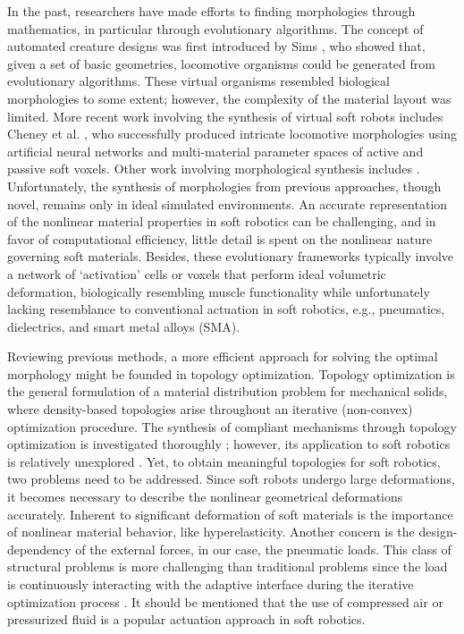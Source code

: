 In the past, researchers have made efforts to finding morphologies through mathematics, in particular through evolutionary algorithms. The concept of automated creature designs was first introduced by Sims \cite{Sims1994}, who showed that, given a set of basic geometries, locomotive organisms could be generated from evolutionary algorithms. These virtual organisms resembled biological morphologies to some extent; however, the complexity of the material layout was limited. More recent work involving the synthesis of virtual soft robots includes Cheney et al. \cite{Cheney2013}, who successfully produced intricate locomotive morphologies using artificial neural networks and multi-material parameter spaces of active and passive soft voxels. Other work involving morphological synthesis includes \cite{Bern2019, Morzadec2019,Diepen2019}. Unfortunately, the synthesis of morphologies from previous approaches, though novel, remains only in ideal simulated environments. An accurate representation of the nonlinear material properties in soft robotics can be challenging, and in favor of computational efficiency, little detail is spent on the nonlinear nature governing soft materials. Besides, these evolutionary frameworks typically involve a network of `activation' cells or voxels that perform ideal volumetric deformation, biologically resembling muscle functionality while unfortunately lacking resemblance to conventional actuation in soft robotics, e.g., pneumatics, dielectrics, and smart metal alloys (SMA).

Reviewing previous methods, a more efficient approach for solving the optimal morphology might be founded in topology optimization. Topology optimization is the general formulation of a material distribution problem for mechanical solids, where density-based topologies arise throughout an iterative (non-convex) optimization procedure. The synthesis of compliant mechanisms through topology optimization is investigated thoroughly \cite{Sigmund2015, Gain2013, Luo2015}; however, its application to soft robotics is relatively unexplored \cite{Zhang2018,Zolfagharian2019}. Yet, to obtain meaningful topologies for soft robotics, two problems need to be addressed. Since soft robots undergo large deformations, it becomes necessary to describe the nonlinear geometrical deformations accurately. Inherent to significant deformation of soft materials is the importance of nonlinear material behavior, like hyperelasticity. Another concern is the design-dependency of the external forces, in our case, the pneumatic loads. This class of structural problems is more challenging than traditional problems since the load is continuously interacting with the adaptive interface during the iterative optimization process \cite{Wang2016, Vasista2013}. It should be mentioned that the use of compressed air or pressurized fluid is a popular actuation approach in soft robotics.

